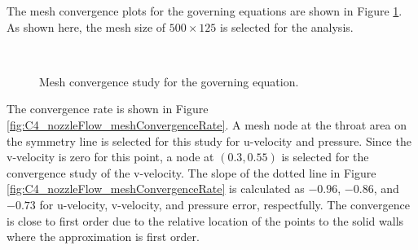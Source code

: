 The mesh convergence plots for the governing equations are shown in Figure \ref{fig:C4_nozzleFlow_meshConvergence}. As shown here, the mesh size of $500 \times 125$ is selected for the analysis.

\begin{figure}[H]
    \centering
    \quad
    \\
    \caption{Mesh convergence study for the governing equation.}
    \label{fig:C4_nozzleFlow_meshConvergence}
\end{figure}

The convergence rate is shown in Figure \ref{fig:C4_nozzleFlow_meshConvergenceRate}. A mesh node at the throat area on the symmetry line is selected for this study for u-velocity and pressure. Since the v-velocity is zero for this point, a node at $(0.3, 0
.55)$ is selected for the convergence study of the v-velocity. The slope of the dotted line in Figure \ref{fig:C4_nozzleFlow_meshConvergenceRate} is calculated as $-0.96$, $-0.86$, and $-0.73$ for u-velocity, v-velocity, and pressure error, respectfully. The convergence is close to first order due to the relative location of the points to the solid walls where the approximation is first order.

